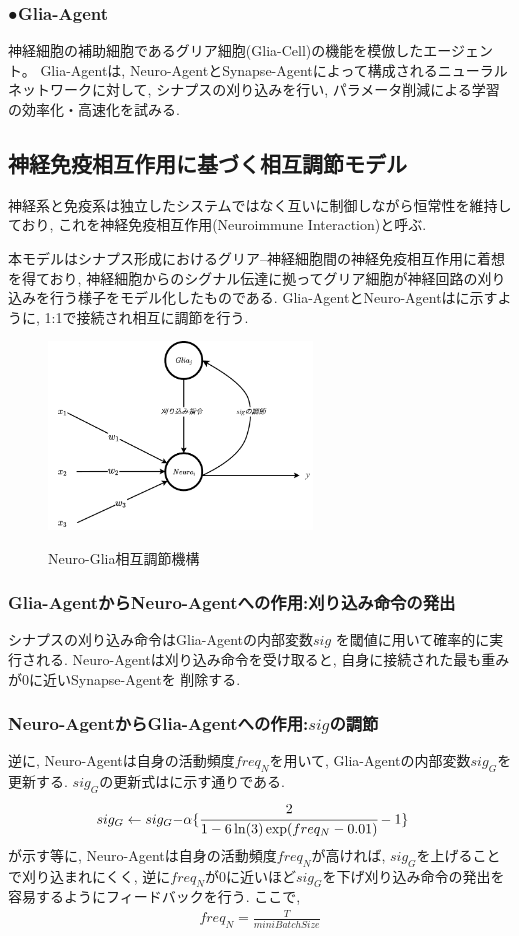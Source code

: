 \documentclass[a4paper,9pt,twocolumn]{jsarticle}
\begin{document}
  \subsubsection*{●Glia-Agent}神経細胞の補助細胞であるグリア細胞(Glia-Cell)の機能を模倣したエージェント。
  Glia-Agentは, Neuro-AgentとSynapse-Agentによって構成されるニューラルネットワークに対して,
  シナプスの刈り込みを行い, パラメータ削減による学習の効率化・高速化を試みる. 

\subsection{神経免疫相互作用に基づく相互調節モデル}
神経系と免疫系は独立したシステムではなく互いに制御しながら恒常性を維持しており, 
これを神経免疫相互作用(Neuroimmune Interaction)と呼ぶ.

本モデルはシナプス形成におけるグリア--神経細胞間の神経免疫相互作用に着想を得ており,
神経細胞からのシグナル伝達に拠ってグリア細胞が神経回路の刈り込みを行う様子をモデル化したものである.
Glia-AgentとNeuro-Agentはに示すように, 1:1で接続され相互に調節を行う.
\vspace{-2zh}
\begin{figure}[H]
  \centering
  \includegraphics[width=7cm]{NeuroGlia.pdf}  
  \label{fig:NeuroGlia}
  \caption{Neuro-Glia相互調節機構}
\end{figure}
\vspace{-2zh}
\subsubsection*{Glia-AgentからNeuro-Agentへの作用:刈り込み命令の発出}
シナプスの刈り込み命令はGlia-Agentの内部変数$sig$
を閾値に用いて確率的に実行される.
Neuro-Agentは刈り込み命令を受け取ると, 自身に接続された最も重みが0に近いSynapse-Agentを
削除する.
\subsubsection*{Neuro-AgentからGlia-Agentへの作用:$sig$の調節}
逆に, Neuro-Agentは自身の活動頻度$freq_N$を用いて, Glia-Agentの内部変数$sig_G$を更新する.
$sig_G$の更新式はに示す通りである.
\begin{align}
  sig_G\leftarrow sig_G-&\alpha\{\cfrac{2}{1-6\ln(3)\exp(freq_N-0.01)}-1\}
  \label{eq:sig}
\end{align}
が示す等に, Neuro-Agentは自身の活動頻度$freq_N$が高ければ, $sig_G$を上げることで刈り込まれにくく, 
逆に$freq_N$が0に近いほど$sig_G$を下げ刈り込み命令の発出を容易するようにフィードバックを行う.
ここで, \begin{align}
  freq_N=\frac{T}{miniBatchSize}
  \label{eq:freq}
\end{align}
\end{document}
